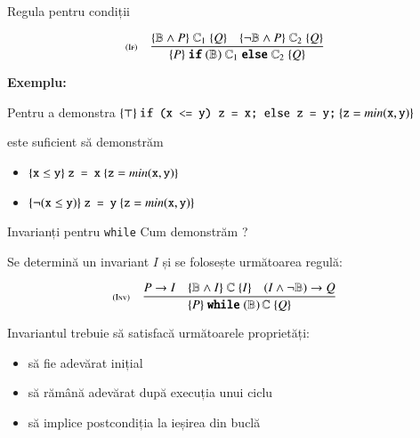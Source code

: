 \documentclass[xcolor=pdftex,romanian,colorlinks]{beamer}
\begin{document}
\begin{frame}{Regula pentru condiții}



\[\reg[If]{\{P\}\Sif (\bexp)\  \cmd_1 \Selse \cmd_2\;\{Q\}}{\{\bexp\wedge P\}\;\cmd_1 \;\{Q\}\si\{\neg \bexp\wedge P\}\;\cmd_2\;\{Q\}}{}\]

\textbf{\color{True} Exemplu:}

Pentru a demonstra  $\{\top\}\ \mbox{\texttt{if (x <= y) z = x; else z = y;}}\ \{\texttt{z} = min(\te{x},\te{y})\}$
  
  este suficient să demonstrăm 
  \begin{itemize}
	\item  $\{\mbox{\texttt{x}}\leq\mbox{\texttt{y}}\}\ \mbox{\texttt{z = x}}\ \{\texttt{z} = min(\mbox{\texttt{x}},\mbox{\texttt{y}})\}$
	\item  $\{\neg (\te{x}\leq\te{y})\}\ \mbox{\texttt{z = y}}\ \{\texttt{z} = min(\te{x},\te{y})\}$
  \end{itemize}



\end{frame}

\begin{frame}{Invarianți pentru \texttt{while}}
 Cum demonstrăm     ? 
\vfill

Se determină un invariant $I$ și se folosește următoarea regulă:

\[\reg[Inv]{\{P\}\Swhile(\bexp)\,\cmd\;\{Q\}}{P\to I\si \{\bexp\wedge I\}\;\cmd \;\{I\}\si (I\wedge \neg{\bexp})\to Q}{}\]



Invariantul trebuie să satisfacă următoarele proprietăți:
\begin{itemize}
\item să fie adevărat inițial
\item să rămână adevărat după execuția unui ciclu
\item să implice postcondiția la ieșirea din buclă
\end{itemize}

\end{frame}
\end{document}

